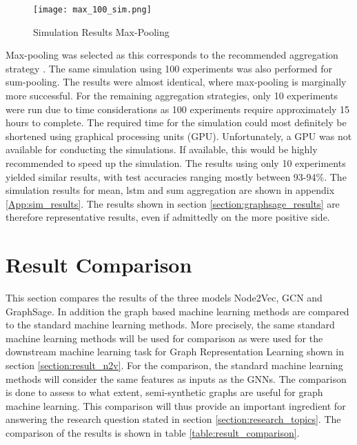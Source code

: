   \begin{figure}[htbp!]
		\centering
		\texttt{[image: max\_100\_sim.png]}
		\caption{Simulation Results Max-Pooling}
        \label{fig:simulation_results}
  \end{figure}

  \noindent Max-pooling was selected as this corresponds to the recommended
  aggregation strategy \citep[p. 9]{hamilton2017inductive}. The same simulation
  using 100 experiments was also performed for sum-pooling. The results were
  almost identical, where max-pooling is marginally more successful. For the 
  remaining aggregation strategies, only 10 experiments were run due to time
  considerations as 100 experiments require approximately 15 hours to complete.
  The required time for the simulation could most definitely be shortened using
  graphical processing units (GPU). Unfortunately, a GPU was not available for
  conducting the simulations. If available, this would be highly recommended to
  speed up the simulation. The results using only 10 experiments yielded similar 
  results, with test accuracies ranging mostly between 93-94\%. The simulation
  results for mean, lstm and sum aggregation are shown in appendix 
  \ref{App:sim_results}. The results shown in section 
  \ref{section:graphsage_results} are therefore representative results, even if 
  admittedly on the more positive side. 

  \section{Result Comparison}
  \label{section:result_comp}

  This section compares the results of the three models Node2Vec, GCN and
  GraphSage. In addition the graph based machine learning methods are compared
  to the standard machine learning methods. More precisely, the same standard
  machine learning methods will be used for comparison as were used for the
  downstream machine learning task for Graph Representation Learning shown in 
  section \ref{section:result_n2v}. For the comparison, the standard machine
  learning methods will consider the same features as inputs as the GNNs. The 
  comparison is done to assess to what extent, semi-synthetic graphs are useful
  for graph machine learning. This comparison will thus provide an important 
  ingredient for answering the research question stated in section 
  \ref{section:research_topics}. The comparison of the results is shown in table 
  \ref{table:result_comparison}.

